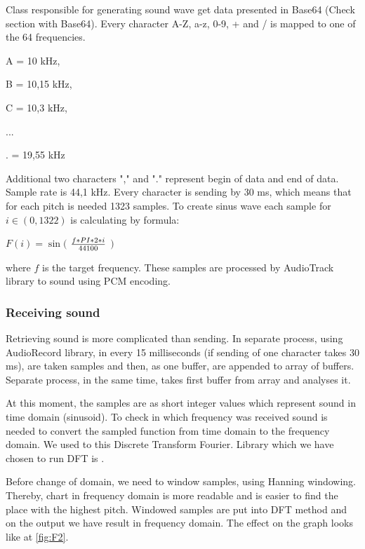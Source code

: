 \documentclass[11pt,titlepage]{article}
\theoremstyle{plain}
\begin{document}
Class responsible for generating sound wave get data presented in Base64 (Check section with Base64). Every character A-Z, a-z, 0-9, + and / is mapped to one of the 64 frequencies.

A = 10 kHz,

B = 10,15 kHz,

C = 10,3 kHz,

...

. = 19,55 kHz


Additional two characters "," and "." represent begin of data and end of data. Sample rate is 44,1 kHz. Every character is sending by 30 ms, which means that for each pitch is needed 1323 samples. To create sinus wave each sample for $ i \in (0,1322) $ is calculating by formula:
\begin{center}
$F(i) = \sin($ $f \ast PI \ast 2 \ast i  \over 44 100 $ $)$
\end{center}
where $f$ is the target frequency.
These samples are processed by AudioTrack library to sound using PCM encoding. 


\subsubsection{Receiving sound}

Retrieving sound is more complicated than sending. In separate process, using AudioRecord library, in every 15 milliseconds (if sending of one character takes 30 ms), are taken samples and then, as one buffer, are appended to array of buffers. Separate process, in the same time, takes first buffer from array and analyses it. 

\vspace{5mm}

At this moment, the samples are as short integer values which represent sound in time domain (sinusoid). To check in which frequency was received sound is needed to convert the sampled function from time domain to the frequency domain. We used to this Discrete Transform Fourier. Library which we have chosen to run DFT is \cite{minim_dft}. 

\vspace{5mm}

Before change of domain, we need to window samples, using Hanning windowing. Thereby, chart in frequency domain is more readable and is easier to find the place with the highest pitch. Windowed samples are put into DFT method and on the output we have result in frequency domain. The effect on the graph looks like at \ref{fig:F2}.
\end{document}
